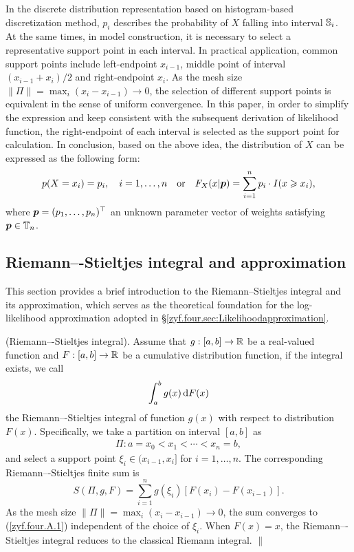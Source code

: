 In the discrete distribution representation based on histogram-based discretization method, $p_i$ describes the probability of \trv $X$ falling into interval ${\mathbb{S}}_i$. At the same times, in model construction, it is necessary to select a representative support point in each interval. In practical application, common support points include left-endpoint $x_{i-1}$, middle point of interval $(x_{i-1} + x_i) / 2$ and right-endpoint $x_i$. As the mesh size $\|\Pi\| = \max_i (x_i - x_{i-1}) \to 0$, the selection of different support points is equivalent in the sense of uniform convergence. In this paper, in order to simplify the expression and keep consistent with the subsequent derivation of likelihood function, the right-endpoint of each interval is selected as the support point for calculation. In conclusion, based on the above idea, the distribution of $X$ can be expressed as the following form:
$$
    p(X = x_i) = p_i, \quad i = 1, \dots, n \quad \mbox{or} \quad F_X(x | {\boldsymbol{p}}) = \sum_{i=1}^n p_i \cdot I(x \geqslant x_i),
$$
where ${\boldsymbol{p}} = (p_1, \dots, p_n)^\top$ an unknown parameter vector of weights satisfying ${\boldsymbol{p}} \in {\mathbb{T}}_n$.

\subsection{Riemann–-Stieltjes integral and approximation}\label{zyf.four.sec:RSintegral}        %

This section provides a brief introduction to the Riemann--Stieltjes integral and its approximation, which serves as the theoretical foundation for the log-likelihood approximation adopted in \S\ref{zyf.four.sec:Likelihoodapproximation}.

\begin{definition}{\rm \textsf{(Riemann–-Stieltjes integral).} Assume that $g: [a, b] \to {\mathbb{R}}$ be a real-valued function and $F: [a, b] \to {\mathbb{R}}$ be a cumulative distribution function, if the integral exists, we call
\begin{eqnarray}    \label{zyf.four.A.1}
    \int_a^b g(x) \,\mbox{d} F(x)
\end{eqnarray}
the Riemann–-Stieltjes integral of function $g(x)$ with respect to distribution $F(x)$. Specifically, we take a partition on interval $[a, b]$ as
\begin{eqnarray}    \label{zyf.four.A.2}
    \Pi: a = x_0 < x_1 < \cdots < x_n = b,
\end{eqnarray}
and select a support point $\xi_i \in (x_{i-1}, x_i]$ for $i = 1, \dots, n$. The corresponding Riemann–-Stieltjes finite sum is
$$
    S(\Pi, g, F) = \sum_{i=1}^n g(\xi_i) [F(x_i) - F(x_{i-1})].
$$
As the mesh size $\|\Pi\| = \max_i (x_i - x_{i-1}) \to 0$, the sum converges to (\ref{zyf.four.A.1}) independent of the choice of $\xi_i$. When $F(x) = x$, the Riemann–-Stieltjes integral reduces to the classical Riemann integral. \hfill$\|$
}\end{definition}

